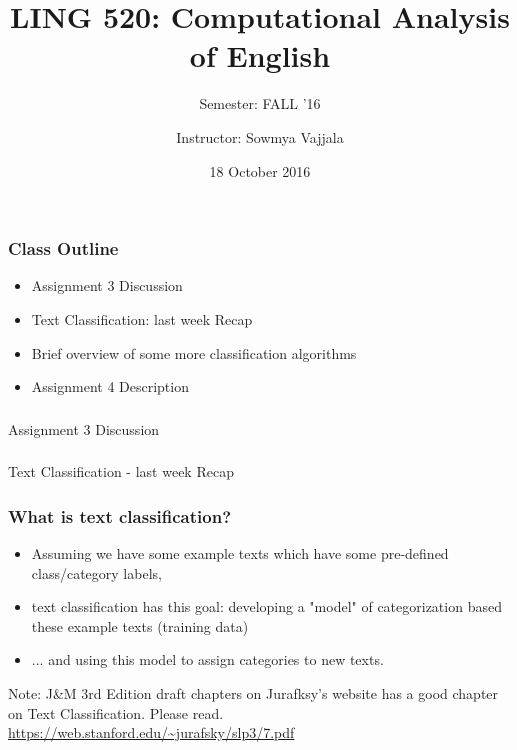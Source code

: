 \documentclass{beamer}
\author[Sowmya Vajjala]{Instructor: Sowmya Vajjala}
\title[LING 520]{LING 520: Computational Analysis of English}
\subtitle{Semester: FALL '16}
\date{18 October 2016}
\institute{Iowa State University, USA}
\begin{document}
\begin{frame}\titlepage
\end{frame}

\begin{frame}
\frametitle{Class Outline}
\begin{itemize}
\item Assignment 3 Discussion
\item Text Classification: last week Recap 
\item Brief overview of some more classification algorithms%
\item Assignment 4 Description
\end{itemize}
\end{frame}

\begin{frame}
\frametitle{}
\Large Assignment 3 Discussion
\end{frame} %

\begin{frame}
\frametitle{}
\Large Text Classification - last week Recap 
\end{frame} %

\begin{frame}
\frametitle{What is text classification?}
\begin{itemize}
\item Assuming we have some example texts which have some pre-defined class/category labels,
\item text classification has this goal: developing a "model" of categorization based these example texts (training data)
\item ... and using this model to assign categories to new texts.
\end{itemize}
Note: J\&M 3rd Edition draft chapters on Jurafksy's website has a good chapter on Text Classification. Please read. \url{https://web.stanford.edu/~jurafsky/slp3/7.pdf}
\end{frame}
\end{document}
